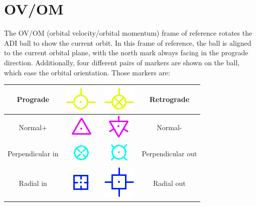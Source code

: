 \documentclass[paper=a4, 11 pt]{report}
\begin{document}
\section{OV/OM}
The OV/OM (orbital velocity/orbital momentum) frame of reference rotates the ADI ball to show the current orbit.
In this frame of reference, the ball is aligned to the current orbital plane, with the north mark always facing in the prograde direction.
Additionally, four different pairs of markers are shown on the ball, which ease the orbital orientation.
Those markers are:

\renewcommand{\arraystretch}{2.5}
\begin{center}
\begin{tabular}{ |c  c | c  c| }
  \hline
  Prograde & \includegraphics[scale=.5]{pgd.png} & \includegraphics[scale=.5]{pgd_2.png} & Retrograde \\ \hline
  Normal+ & \includegraphics[scale=.5]{nml.png} & \includegraphics[scale=.5]{nml_2.png} & Normal- \\ \hline
  Perpendicular in & \includegraphics[scale=.5]{perp_in.png} & \includegraphics[scale=.5]{perp_out.png} & Perpendicular out \\ \hline
  Radial in & \includegraphics[scale=.5]{rad_in.png} & \includegraphics[scale=.5]{rad_out.png} & Radial out \\ \hline
\end{tabular}
\end{center}
\end{document}
